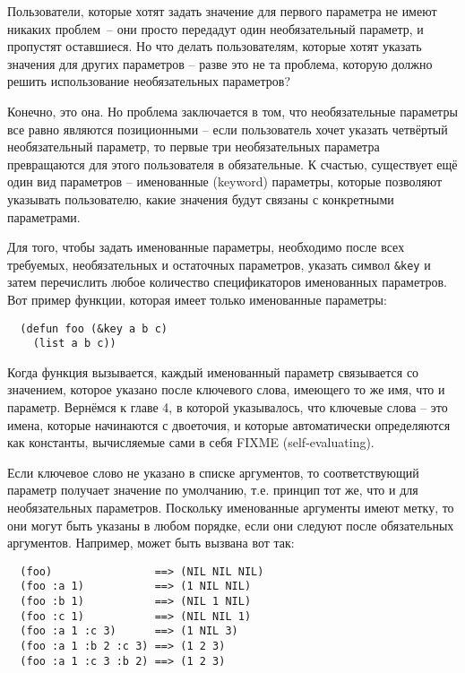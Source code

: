 Пользователи, которые хотят задать значение для первого параметра не имеют никаких
проблем~-- они просто передадут один необязательный параметр, и пропустят оставшиеся.  Но
что делать пользователям, которые хотят указать значения для других параметров -- разве
это не та проблема, которую должно решить использование необязательных параметров?

Конечно, это она.  Но проблема заключается в том, что необязательные параметры все равно
являются позиционными -- если пользователь хочет указать четвёртый необязательный
параметр, то первые три необязательных параметра превращаются для этого пользователя в
обязательные.  К счастью, существует ещё один вид параметров -- именованные (keyword)
параметры, которые позволяют указывать пользователю, какие значения будут связаны с
конкретными параметрами.

Для того, чтобы задать именованные параметры, необходимо после всех требуемых,
необязательных и остаточных параметров, указать символ \lstinline!&key! и затем
перечислить любое количество спецификаторов именованных параметров.  Вот пример функции,
которая имеет только именованные параметры:

\begin{lstlisting}
  (defun foo (&key a b c) 
    (list a b c))
\end{lstlisting}

Когда функция вызывается, каждый именованный параметр связывается со значением, которое
указано после ключевого слова, имеющего то же имя, что и параметр.  Вернёмся к главе 4, в
которой указывалось, что ключевые слова -- это имена, которые начинаются с двоеточия, и
которые автоматически определяются как константы, вычисляемые сами в себя FIXME
(self-evaluating).

Если ключевое слово не указано в списке аргументов, то соответствующий параметр получает
значение по умолчанию, т.е. принцип тот же, что и для необязательных параметров.
Поскольку именованные аргументы имеют метку, то они могут быть указаны в любом порядке,
если они следуют после обязательных аргументов.  Например,  может быть вызвана
вот так:

\begin{verbatim}
  (foo)                ==> (NIL NIL NIL)
  (foo :a 1)           ==> (1 NIL NIL)
  (foo :b 1)           ==> (NIL 1 NIL)
  (foo :c 1)           ==> (NIL NIL 1)
  (foo :a 1 :c 3)      ==> (1 NIL 3)
  (foo :a 1 :b 2 :c 3) ==> (1 2 3)
  (foo :a 1 :c 3 :b 2) ==> (1 2 3)
\end{verbatim}

